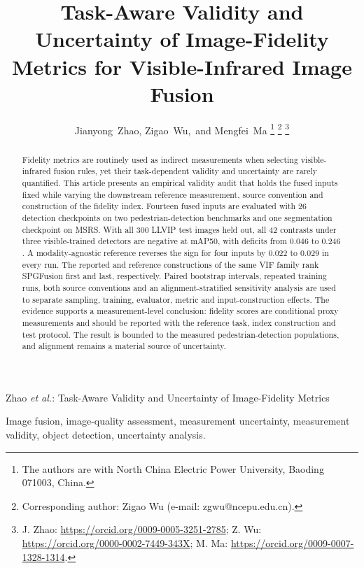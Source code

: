 \documentclass[journal]{IEEEtran}
\begin{document}
\title{Task-Aware Validity and Uncertainty of Image-Fidelity Metrics for
Visible-Infrared Image Fusion}

\author{Jianyong~Zhao, Zigao~Wu,~and Mengfei~Ma%
\thanks{The authors are with North China Electric Power University, Baoding
071003, China.}%
\thanks{Corresponding author: Zigao Wu (e-mail: zgwu@ncepu.edu.cn).}%
\thanks{J. Zhao: \url{https://orcid.org/0009-0005-3251-2785};
Z. Wu: \url{https://orcid.org/0000-0002-7449-343X};
M. Ma: \url{https://orcid.org/0009-0007-1328-1314}.}}

%
{Zhao \MakeLowercase{\textit{et al.}}: Task-Aware Validity and Uncertainty of Image-Fidelity Metrics}

\maketitle

\begin{abstract}
Fidelity metrics are routinely used as indirect measurements when selecting
visible-infrared fusion rules, yet their task-dependent validity and uncertainty are
rarely quantified. This article presents an empirical validity audit that holds the
fused inputs fixed while varying the downstream reference measurement, source
convention and construction of the fidelity index. Fourteen fused inputs are evaluated
with 26 detection checkpoints on two pedestrian-detection benchmarks and one
segmentation checkpoint on MSRS. With all 300 LLVIP test images held out, all 42
contrasts under three visible-trained detectors are negative at mAP50, with deficits
from $0.046$ to $0.246$. A modality-agnostic reference reverses the sign for four
inputs by $0.022$ to $0.029$ in every run. The reported and reference constructions of
the same VIF family rank SPGFusion first and last, respectively. Paired bootstrap
intervals, repeated training runs, both source conventions and an alignment-stratified
sensitivity analysis are used to separate sampling, training, evaluator, metric and
input-construction effects. The evidence supports a measurement-level conclusion:
fidelity scores are conditional proxy measurements and should be reported with the
reference task, index construction and test protocol. The result is bounded to the
measured pedestrian-detection populations, and alignment remains a material source of
uncertainty.
\end{abstract}

\begin{IEEEkeywords}
Image fusion, image-quality assessment, measurement uncertainty, measurement
validity, object detection, uncertainty analysis.
\end{IEEEkeywords}
\end{document}
